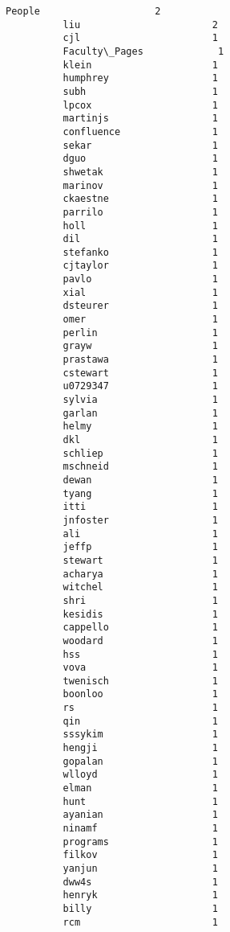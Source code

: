 \documentclass[11pt]{article}
\begin{document}
\begin{Verbatim}[commandchars=\\\{\}]
          People                    2
          liu                       2
          cjl                       1
          Faculty\_Pages             1
          klein                     1
          humphrey                  1
          subh                      1
          lpcox                     1
          martinjs                  1
          confluence                1
          sekar                     1
          dguo                      1
          shwetak                   1
          marinov                   1
          ckaestne                  1
          parrilo                   1
          holl                      1
          dil                       1
          stefanko                  1
          cjtaylor                  1
          pavlo                     1
          xial                      1
          dsteurer                  1
          omer                      1
          perlin                    1
          grayw                     1
          prastawa                  1
          cstewart                  1
          u0729347                  1
          sylvia                    1
          garlan                    1
          helmy                     1
          dkl                       1
          schliep                   1
          mschneid                  1
          dewan                     1
          tyang                     1
          itti                      1
          jnfoster                  1
          ali                       1
          jeffp                     1
          stewart                   1
          acharya                   1
          witchel                   1
          shri                      1
          kesidis                   1
          cappello                  1
          woodard                   1
          hss                       1
          vova                      1
          twenisch                  1
          boonloo                   1
          rs                        1
          qin                       1
          sssykim                   1
          hengji                    1
          gopalan                   1
          wlloyd                    1
          elman                     1
          hunt                      1
          ayanian                   1
          ninamf                    1
          programs                  1
          filkov                    1
          yanjun                    1
          dww4s                     1
          henryk                    1
          billy                     1
          rcm                       1

\end{Verbatim}
\end{document}
